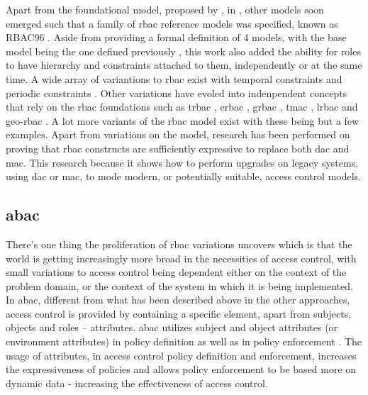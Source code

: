 Apart from the foundational model, proposed by \citeauthor{ferraiolo_role-based_1992}, in \citeyear{ferraiolo_role-based_1992}, other models soon emerged such that a family of \gls{rbac} reference models was specified, known as RBAC96 \cite{sandhu_role-based_1996}. Aside from providing a formal definition of 4 models, with the base model being the one defined previously \cite{ferraiolo_role-based_1992}, this work also added the ability for roles to have hierarchy and constraints attached to them, independently or at the same time. A wide array of variantions to \gls{rbac} exist with temporal constraints \cite{bertino_supporting_1996, bertino_temporal_1996} and periodic constraints \cite{bertino_access_1998}. Other variations have evoled into indenpendent concepts that rely on the \gls{rbac} foundations such as \gls{trbac} \cite{bertino_trbac:_2000}, \gls{erbac} \cite{bonatti_erbac:_2013}, \gls{grbac} \cite{covington_generalized_2000}, \gls{tmac} \cite{thomas_team-based_1997}, \gls{lrbac} \cite{ray_lrbac:_2006} and \gls{geo-rbac} \cite{damiani_georbac:_2007}. A lot more variants of the \gls{rbac} model exist with these being but a few examples. Apart from variations on the model, research has been performed on proving that \gls{rbac} constructs are sufficiently expressive to replace both \gls{dac} and \gls{mac}. This research because it shows how to perform upgrades on legacy systems, using \gls{dac} or \gls{mac}, to mode modern, or potentially suitable, access control models.

\subsection{\glsdesc{abac}}

There's one thing the proliferation of \gls{rbac} variations uncovers which is that the world is getting increasingly more broad in the necessities of access control, with small variations to access control being dependent either on the context of the problem domain, or the context of the system in which it is being implemented. In \gls{abac}, different from what has been described above in the other approaches, access control is provided by containing a specific element, apart from subjects, objects and roles – attributes. \gls{abac} utilizes subject and object attributes (or environment attributes) in policy definition as well as in policy enforcement \cite{hu_guide_2014}. The usage of attributes, in access control policy definition and enforcement, increases the expressiveness of policies and allows policy enforcement to be based more on dynamic data - increasing the effectiveness of access control.

